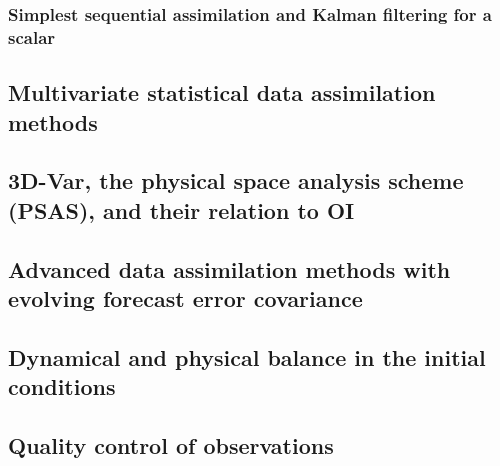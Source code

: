 \subsubsection{Simplest sequential assimilation and Kalman filtering for a scalar}
\label{subs:squares:sequential}

\subsection{Multivariate statistical data assimilation methods}
\label{sub:data_assimilation:multivar}

\subsection{3D-Var, the physical space analysis scheme (PSAS), and their relation to OI}
\label{sub:data_assimilation:3d-var}

\subsection{Advanced data assimilation methods with evolving forecast error covariance}
\label{sub:data_assimilation:advanced}

\subsection{Dynamical and physical balance in the initial conditions}
\label{sub:data_assimilation:balance}

\subsection{Quality control of observations}
\label{sub:data_assimilation:quality}



